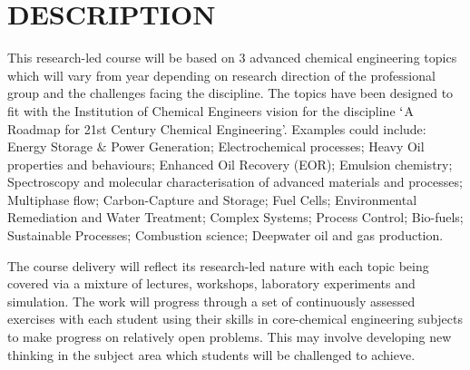 \documentclass[12pts,a4paper,amsmath,amssymb,floatfix]{article}%
\begin{document}
\section{DESCRIPTION}
This research-led course will be based on 3 advanced chemical engineering topics which will vary from year depending on research direction of the professional group and the challenges facing the discipline. The topics have been designed to fit with the Institution of Chemical Engineers vision for the discipline $\lq$A Roadmap for 21st Century Chemical Engineering'.  Examples could include: Energy Storage $\&$ Power Generation; Electrochemical processes; Heavy Oil properties and behaviours; Enhanced Oil Recovery (EOR); Emulsion chemistry; Spectroscopy and molecular characterisation of advanced materials and processes; Multiphase flow; Carbon-Capture and Storage; Fuel Cells; Environmental Remediation and Water Treatment; Complex Systems; Process Control; Bio-fuels; Sustainable Processes; Combustion science; Deepwater oil and gas production.

The course delivery will reflect its research-led nature with each topic being covered via a mixture of lectures, workshops, laboratory experiments and simulation. The work will progress through a set of continuously assessed exercises with each student using their skills in core-chemical engineering subjects to make progress on relatively open problems. This may involve developing new thinking in the subject area which students will be challenged to achieve.


\end{document}
